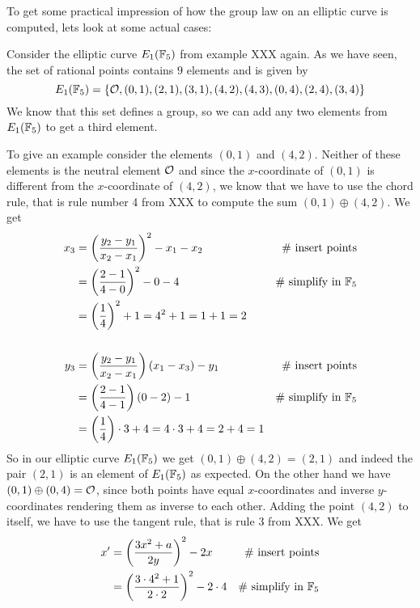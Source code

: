 To get some practical impression of how the group law on an elliptic curve is computed, lets look at some actual cases: 
\begin{example}Consider the elliptic curve $E_1(\mathbb{F}_5)$ from example XXX again.  As we have seen, the set of rational points contains $9$ elements and is given by
$$
E_1(\mathbb{F}_5) = \{\mathcal{O}, (0,1),(2,1),(3,1),(4,2),(4,3),(0,4),(2,4),(3,4)\}
$$
We know that this set defines a group, so we can add any two elements from $E_1(\mathbb{F}_5)$ to get a third element. 

To give an example consider the elements $(0,1)$ and $(4,2)$. Neither of these elements is the neutral element $\mathcal{O}$ and since the $x$-coordinate of $(0,1)$ is different from the $x$-coordinate of $(4,2)$, we know that we have to use the chord rule, that is rule number 4 from XXX to compute the sum $(0,1)\oplus (4,2)$. We get
\begin{align*}
x_3  & = \left(\frac{y_2-y_1}{x_2-x_1}\right)^2 -x_1-x_2 & \text{\# insert points}\\
     & = \left(\frac{2-1}{4-0}\right)^2 -0-4  & \text{\# simplify in } \mathbb{F}_5\\
     & = \left(\frac{1}{4}\right)^2 +1
       = 4^2 +1
       = 1 +1 
       = 2
\\
\\
y_3  & = \left(\frac{y_2-y_1}{x_2-x_1} \right)\left(x_1-x_3\right) - y_1  & \text{\# insert points}\\     
     & = \left(\frac{2-1}{4-1} \right)\left(0-2\right) - 1   & \text{\# simplify in } \mathbb{F}_5\\    
     & = \left(\frac{1}{4} \right)\cdot 3 + 4   
       = 4\cdot 3 + 4
       = 2 + 4
       = 1          
\end{align*} 
So in our elliptic curve $E_1(\mathbb{F}_5)$ we get $(0,1)\oplus (4,2) =(2,1)$ and indeed the pair $(2,1)$ is an element of $E_1(\mathbb{F}_5)$ as expected. On the other hand we have $(0,1)\oplus (0,4) =\mathcal{O}$, since both points have equal $x$-coordinates and inverse $y$-coordinates rendering them as inverse to each other. Adding the point $(4,2)$ to itself, we have to use the tangent rule, that is rule 3 from XXX. We get 
\begin{align*}
x'  & = \left(\frac{3x^2+a}{2y}\right)^2 -2x   & \text{\# insert points}\\
    & = \left(\frac{3\cdot 4^2+1}{2\cdot 2}\right)^2 -2\cdot 4 & \text{\# simplify in } \F_5 \\

\end{align*}
\end{example}
